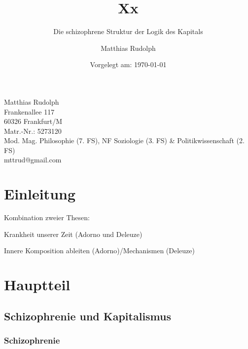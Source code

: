 \documentclass[12pt,
               DIV13,
               paper=a4,
               twoside=false,
               onehalfspacing,
               bibliography=totoc,
               toc=graduated,
               draft,
               ]{scrartcl}
\begin{document}
\setcounter{page}{0}

\titlehead{Goethe-Universität Frankfurt am Main\\
Fachbereich Philosophie und Geschichtswissenschaften\\
Institut für Philosophie\\
Prof. Dr. Christoph Menke\\
Seminar: Demokratie und Kapitalismus,
SoSe 2013\\
Modul: VM 3b}
\title{Xx}
\subtitle{Die schizophrene Struktur der Logik des Kapitals}
\author{Matthias Rudolph}
\date{Vorgelegt am: \today}

\maketitle
\vfill

\noindent Matthias Rudolph\\
Frankenallee 117\\
60326 Frankfurt/M\\
Matr.-Nr.: 5273120\\
Mod. Mag. Philosophie (7. FS), NF Soziologie (3. FS) \& Politikwissenschaft (2. FS)\\ %
mttrud@gmail.com
\newpage

\tableofcontents
\newpage


\section{Einleitung}

Kombination zweier Thesen:

Krankheit unserer Zeit (Adorno und Deleuze)

Innere Komposition ableiten (Adorno)/Mechanismen (Deleuze)

\section{Hauptteil}

\subsection{Schizophrenie und Kapitalismus}

\subsubsection{Schizophrenie}
\end{document}
